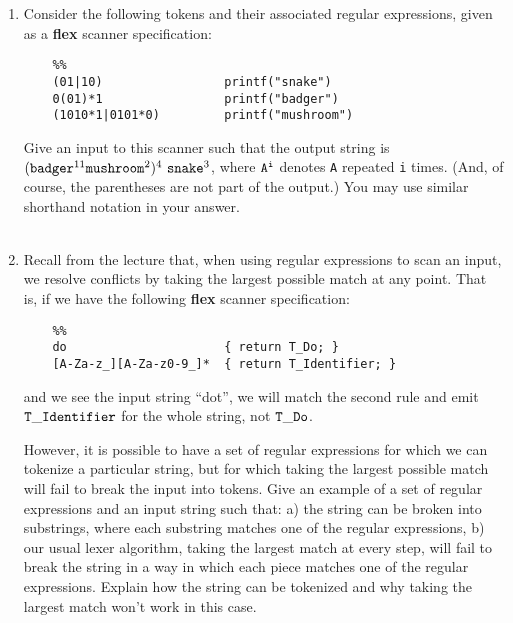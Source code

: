 \documentclass[11pt]{article}
\begin{document}
\begin{enumerate}
  
  \newpage
  
  \item Consider the following tokens and their associated regular expressions, given as a \textbf{flex} scanner specification:
  
  \begin{lstlisting}
    %%
    (01|10)                 printf("snake")
    0(01)*1                 printf("badger")
    (1010*1|0101*0)         printf("mushroom")
  \end{lstlisting}
  
  Give an input to this scanner such that the output string is $\tt (badger^{\rm 11}  mushroom^{\rm 2})^{\rm 4}\ snake^{\rm 3}$, where $\tt A^i$ denotes {\tt A} repeated {\tt i} times.   (And, of course, the parentheses are not part of the output.)  You may use similar shorthand notation in your answer. \\ \\

  \[
  \]
  
  \newpage
    
  \item Recall from the lecture that, when using regular expressions to scan an input, we resolve conflicts by taking the largest possible match at any point. That is, if we have the following \textbf{flex} scanner specification:
  
  \begin{lstlisting}
    %%
    do                      { return T_Do; }
    [A-Za-z_][A-Za-z0-9_]*  { return T_Identifier; }
  \end{lstlisting} 
  
  and we see the input string ``dot'', we will match the second rule and emit $\tt T\_Identifier$ for the whole string, not $\tt T\_Do$.
  
  However, it is possible to have a set of regular expressions for which we can tokenize a particular string, but for which taking the largest possible match will fail to break the input into tokens. Give an example of a set of regular expressions and an input string such that: a) the string can be broken into substrings, where each substring matches one of the regular expressions, b) our usual lexer algorithm, taking the largest match at every step, will fail to break the string in a way in which each piece matches one of the regular expressions. Explain how the string can be tokenized and why taking the largest match won't work in this case. \\ \\ 
  
  

\end{enumerate}
\end{document}
